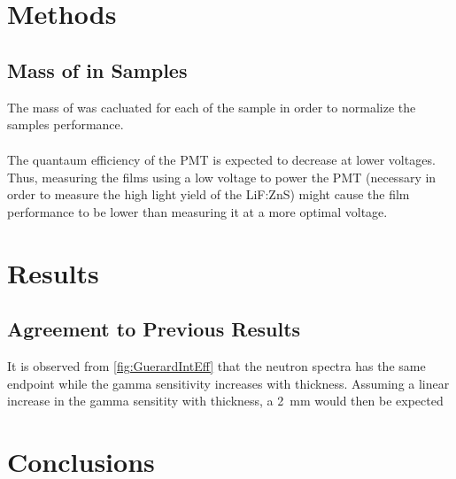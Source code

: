 \documentclass[draftcls,onecolumn]{IEEEtran}
\begin{document}
\section{Methods}

\subsection{Mass of  in Samples}
The mass of  was cacluated for each of the sample in order to normalize the samples performance.
\begin{align}

\end{align}

The quantaum efficiency of the PMT is expected to decrease at lower voltages.
Thus, measuring the films using a low voltage to power the PMT (necessary in order to measure the high light yield of the LiF:ZnS) might cause the film performance to be lower than measuring it at a more optimal voltage.


\section{Results}

\subsection{Agreement to Previous Results}
It is observed from \autoref{fig:GuerardIntEff} that the neutron spectra has the same endpoint while the gamma sensitivity increases with thickness.
Assuming a linear increase in the gamma sensitity with thickness, a \SI{2}{\mm} would then be expected 

\section{Conclusions}
\end{document}
